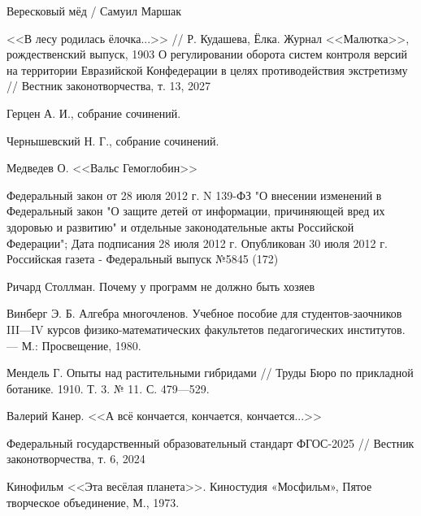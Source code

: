\begin{thebibliography}{99}

 Вересковый мёд / Самуил Маршак

 <<В лесу родилась ёлочка...>> // Р. Кудашева, Ёлка. Журнал <<Малютка>>, рождественский выпуск, 1903
О регулировании оборота систем контроля версий на территории Евразийской Конфедерации в целях противодействия экстретизму
// Вестник законотворчества, т. 13, 2027

 Герцен А. И., собрание сочинений.

 Чернышевский Н. Г., собрание сочинений.

 Медведев О. <<Вальс Гемоглобин>>

  Федеральный закон от 28 июля 2012 г. N 139-ФЗ "О внесении изменений в Федеральный закон "О защите детей от информации, причиняющей вред их здоровью и развитию" и отдельные законодательные акты Российской Федерации"; Дата подписания 28 июля 2012 г. Опубликован 30 июля 2012 г. Российская газета - Федеральный выпуск №5845 (172)

 Ричард Столлман. Почему у программ не должно быть хозяев

 Винберг Э. Б. Алгебра многочленов. Учебное пособие для студентов-заочников III—IV курсов физико-математических факультетов педагогических институтов. — М.: Просвещение, 1980.

 Мендель Г. Опыты над растительными гибридами // Труды Бюро по прикладной ботанике. 1910. Т. 3. № 11. С. 479—529.

 Валерий Канер. <<А всё кончается, кончается, кончается...>>

 Федеральный государственный образовательный стандарт ФГОС-2025 // Вестник законотворчества, т. 6, 2024

 Кинофильм <<Эта весёлая планета>>. Киностудия «Мосфильм», Пятое творческое объединение, М., 1973.

\end{thebibliography}

